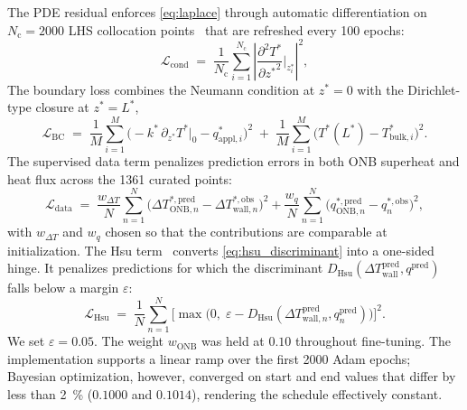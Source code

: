 The PDE residual enforces \cref{eq:laplace} through automatic
differentiation on $N_{\mathrm{c}}=\num{2000}$ LHS collocation
points~\citep{mckay1979lhs} that are refreshed every \num{100} epochs:
%
\begin{equation}\label{eq:L_cond}
\mathcal{L}_{\mathrm{cond}}
\;=\;
\frac{1}{N_{\mathrm{c}}}
\sum_{i=1}^{N_{\mathrm{c}}}
\left|
\frac{\partial^{2} T^{*}}{\partial {z^{*}}^{2}}\bigg|_{z^{*}_{i}}
\right|^{2},
\end{equation}
%
The boundary loss combines the Neumann condition at $z^{*}=0$ with the
Dirichlet-type closure at $z^{*}=L^{*}$,
%
\begin{equation}\label{eq:L_BC}
\mathcal{L}_{\mathrm{BC}}
\;=\;
\frac{1}{M}\sum_{i=1}^{M}
\bigl(-k^{*}\,\partial_{z^{*}} T^{*}\big|_{0}
       - q^{*}_{\mathrm{appl},i}\bigr)^{2}
\;+\;
\frac{1}{M}\sum_{i=1}^{M}
\bigl(T^{*}(L^{*}) - T^{*}_{\mathrm{bulk},i}\bigr)^{2}.
\end{equation}
%
The supervised data term penalizes prediction errors in both ONB
superheat and heat flux across the \num{1361} curated points:
%
\begin{equation}\label{eq:L_data}
\mathcal{L}_{\mathrm{data}}
\;=\;
\frac{w_{\Delta T}}{N}
\sum_{n=1}^{N}
\bigl(
\Delta T^{*,\mathrm{pred}}_{\mathrm{ONB},n} - \Delta T^{*,\mathrm{obs}}_{\mathrm{wall},n}
\bigr)^{2}
+
\frac{w_{q}}{N}
\sum_{n=1}^{N}
\bigl(
q^{*,\mathrm{pred}}_{\mathrm{ONB},n} - q^{*,\mathrm{obs}}_{n}
\bigr)^{2},
\end{equation}
%
with $w_{\Delta T}$ and $w_{q}$ chosen so that the contributions are
comparable at initialization. The Hsu
term~\citep{hsu1962,basu2002} converts \cref{eq:hsu_discriminant} into
a one-sided hinge. It penalizes predictions for which the discriminant
$D_{\mathrm{Hsu}}(\Delta T^{\mathrm{pred}}_{\mathrm{wall}}, q^{\mathrm{pred}})$
falls below a margin $\varepsilon$:
%
\begin{equation}\label{eq:L_Hsu}
\mathcal{L}_{\mathrm{Hsu}}
\;=\;
\frac{1}{N}
\sum_{n=1}^{N}
\bigl[
\max\bigl(0,\;\varepsilon - D_{\mathrm{Hsu}}(\Delta T^{\mathrm{pred}}_{\mathrm{wall},n},
                                              q^{\mathrm{pred}}_{n})\bigr)
\bigr]^{2}.
\end{equation}
%
We set $\varepsilon=\num{0.05}$. The weight $w_{\mathrm{ONB}}$ was held
at $\num{0.10}$ throughout fine-tuning. The implementation supports a
linear ramp over the first \num{2000} Adam epochs; Bayesian
optimization, however, converged on start and end values that differ
by less than \SI{2}{\percent} ($\num{0.1000}$ and $\num{0.1014}$),
rendering the schedule effectively constant.

